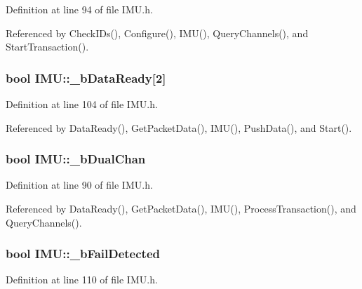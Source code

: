 Definition at line 94 of file IMU.h.



Referenced by CheckIDs(), Configure(), IMU(), QueryChannels(), and StartTransaction().

\hypertarget{class_i_m_u_a8a71f0728b2d849d1d8e54fcb58aad4e}{
\subsubsection[{\_\-bDataReady}]{\setlength{\rightskip}{0pt plus 5cm}bool {\bf IMU::\_\-bDataReady}\mbox{[}2\mbox{]}}}
\label{class_i_m_u_a8a71f0728b2d849d1d8e54fcb58aad4e}


Definition at line 104 of file IMU.h.



Referenced by DataReady(), GetPacketData(), IMU(), PushData(), and Start().

\hypertarget{class_i_m_u_a62978e791838c3b4829e1d3d683e99b2}{
\subsubsection[{\_\-bDualChan}]{\setlength{\rightskip}{0pt plus 5cm}bool {\bf IMU::\_\-bDualChan}}}
\label{class_i_m_u_a62978e791838c3b4829e1d3d683e99b2}


Definition at line 90 of file IMU.h.



Referenced by DataReady(), GetPacketData(), IMU(), ProcessTransaction(), and QueryChannels().

\hypertarget{class_i_m_u_a12238a84e20f54c5fe799e0b37feb0ea}{
\subsubsection[{\_\-bFailDetected}]{\setlength{\rightskip}{0pt plus 5cm}bool {\bf IMU::\_\-bFailDetected}}}
\label{class_i_m_u_a12238a84e20f54c5fe799e0b37feb0ea}


Definition at line 110 of file IMU.h.



